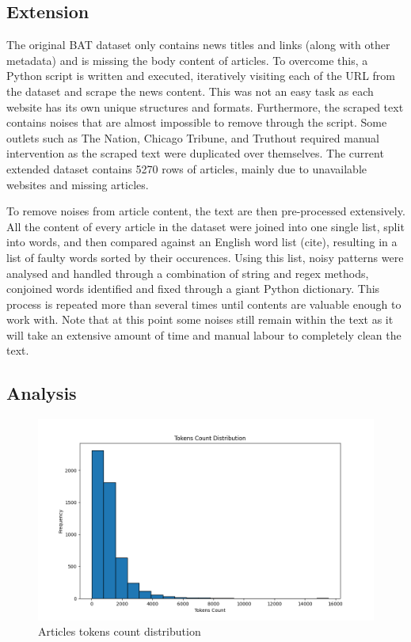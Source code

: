 \subsection{Extension}

The original BAT dataset only contains news titles and links (along with other metadata) and is missing the body content of articles. To overcome this, a Python script is written and executed, iteratively visiting each of the URL from the dataset and scrape the news content. This was not an easy task as each website has its own unique structures and formats. Furthermore, the scraped text contains noises that are almost impossible to remove through the script. Some outlets such as The Nation, Chicago Tribune, and Truthout required manual intervention as the scraped text were duplicated over themselves. The current extended dataset contains 5270 rows of articles, mainly due to unavailable websites and missing articles.

To remove noises from article content, the text are then pre-processed extensively. All the content of every article in the dataset were joined into one single list, split into words, and then compared against an English word list (cite), resulting in a list of faulty words sorted by their occurences. Using this list, noisy patterns were analysed and handled through a combination of string and regex methods, conjoined words identified and fixed through a giant Python dictionary. This process is repeated more than several times until contents are valuable enough to work with. Note that at this point some noises still remain within the text as it will take an extensive amount of time and manual labour to completely clean the text.

\subsection{Analysis}

\begin{figure}[ht]
    \centering
    \includegraphics[width=0.9\linewidth]{figures/tokens_count_vx_hist.png}
    \caption{Articles tokens count distribution}
    \label{fig:tokens_hist}
\end{figure}

